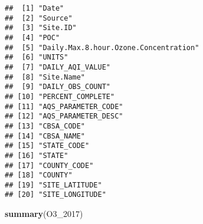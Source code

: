\documentclass[]{article}
\newenvironment{Shaded}{\begin{snugshade}}{\end{snugshade}}
\newcommand{\KeywordTok}[1]{\textcolor[rgb]{0.13,0.29,0.53}{\textbf{#1}}}
\newcommand{\DecValTok}[1]{\textcolor[rgb]{0.00,0.00,0.81}{#1}}
\newcommand{\NormalTok}[1]{#1}
\begin{document}
\begin{verbatim}
##  [1] "Date"                                
##  [2] "Source"                              
##  [3] "Site.ID"                             
##  [4] "POC"                                 
##  [5] "Daily.Max.8.hour.Ozone.Concentration"
##  [6] "UNITS"                               
##  [7] "DAILY_AQI_VALUE"                     
##  [8] "Site.Name"                           
##  [9] "DAILY_OBS_COUNT"                     
## [10] "PERCENT_COMPLETE"                    
## [11] "AQS_PARAMETER_CODE"                  
## [12] "AQS_PARAMETER_DESC"                  
## [13] "CBSA_CODE"                           
## [14] "CBSA_NAME"                           
## [15] "STATE_CODE"                          
## [16] "STATE"                               
## [17] "COUNTY_CODE"                         
## [18] "COUNTY"                              
## [19] "SITE_LATITUDE"                       
## [20] "SITE_LONGITUDE"
\end{verbatim}

\begin{Shaded}
\begin{Highlighting}[]
\KeywordTok{summary}\NormalTok{(O3_}\DecValTok{2017}\NormalTok{)}
\end{Highlighting}
\end{Shaded}
\end{document}
